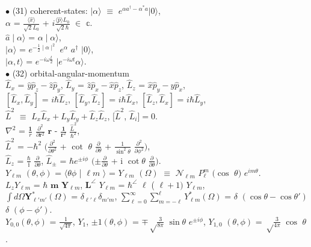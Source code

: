 \documentclass[10pt,fancy]{elegantbook}
\begin{document}
{$\bullet$ (31) coherent-states: $|\alpha \rangle$ $\equiv$ $e^{\alpha{a}^\dagger - \alpha^*{a}}|0 \rangle$,  \\  
$\alpha$ = $\frac{\langle \hat{x} \rangle} {\sqrt2{L_0}}$ + $i \frac{\langle \hat{p} \rangle L_0} {\sqrt2 \hbar}$ $\in$ $\mathbb{c}$.  \\    
$\hat{a}\mid \alpha \rangle$ = $\alpha \mid \alpha \rangle$,  \\  
$\mid \alpha \rangle$ = $e^{-{\frac{1}{2} \mid \alpha \mid^2}}$ $e^\alpha$ $a^\dagger$ $\mid 0 \rangle$,  \\    
$\mid \alpha, t \rangle$ = $e^{-i \omega \frac{t}{2}}$ $\mid e^{-i \omega t} \alpha \rangle$.  \\

$\bullet$ (32) orbital-angular-momentum \\
$\hat{L}_x$ = $\hat{y} \hat{p}_z - \hat{z} \hat{p}_y$, $\hat{L}_y$ = $\hat{z} \hat{p}_x - \hat{x} \hat{p}_z$, $\hat{L}_z$ = $\hat{x} \hat{p}_y - \hat{y} \hat{p}_x$,  \\  
$[\hat{L}_x, \hat{L}_y]$ = $i \hbar \hat{L}_z$, $[\hat{L}_y, \hat{L}_z]$ = $i \hbar \hat{L}_x$, $[\hat{L}_z, \hat{L}_x]$ = $i \hbar \hat{L}_y$,  \\  
$\hat{L}^2$ $\equiv$ $\hat{L}_x \hat{L}_x + \hat{L}_y \hat{L}_y + \hat{L}_z \hat{L}_z$, $[\hat{L}^2$, $\hat{L}_i] = 0$. \\ 
$\nabla^2$ = $\frac{\mathbf 1} {r}$ $\frac{\partial^2}{\partial \mathbf r^2}$ $\mathbf r$ - $\frac{\mathbf 1} {\mathbf r^2}$ $\frac{\hat L^2} {\hbar^2}$,  \\
$\hat{L}^2$ = $- \hbar^2$ $(\frac{\partial^2}{\partial \theta^2}$ + $\cot$ $\theta$ $\frac{\partial}{\partial \theta}$ + $\frac{1}{\sin^2 \theta}$ $\frac{\partial^2}{\partial \phi^2})$,  \\  
$\hat{L}_z$ = $\frac{\hbar}{\mathbb i}$ $\frac{\partial}{\partial \theta}$, $\hat{L}_\pm$ = $\hbar e^{\pm i \phi}$ $(\pm\frac{\partial}{\partial \theta}$ + i $\cot \theta$ $\frac{\partial}{\partial \theta})$.  \\  
$Y_{\ell m}$ $(\theta, \phi)$ = $\langle \theta \phi$ |  ${\ell m}$ $\rangle$ = $Y_{\ell m}$ $(\Omega)$ $\equiv$ $\mathcal N_{\ell m}$ $P^m_\ell$ $(\cos$ $\theta)$ $e^{i m \theta}$.  \\
$L_z Y_{\ell m}$ = $\hbar$ $\mathbf m$ $\mathbf Y_{\ell m}$, $\mathbf L^\angle$ $Y_{\ell m}$ = $\hbar^\angle$ $\ell$ ( $\ell + 1 )$ $Y_{\ell m}$, \\ 
$\int d \Omega \mathbf Y^*_{\ell' m'} (\Omega)$ = $\delta_{\ell' \ell} \delta_{m' m}$, $\sum_{\ell = 0}^\infty \sum_{m = - \ell}^\ell Y^*_{\ell m} (\Omega)$ = $\delta$ $(\cos\theta - \cos\theta')$ $\delta$ $(\phi - \phi')$.  \\  
$Y_{0,0}(\theta, \phi)$ = $\frac{1} {\sqrt{4 \pi}}$, $Y_1$, $\pm 1 (\theta, \phi)$ = $\mp {\sqrt \frac{3}{8 \pi}}$ $\sin \theta$ $e^{\pm i \phi}$, $Y_{1,0}$ $(\theta, \phi)$ = ${\sqrt \frac{3}{4 \pi}}$ $\cos$ $\theta$. \\

}
\end{document}
